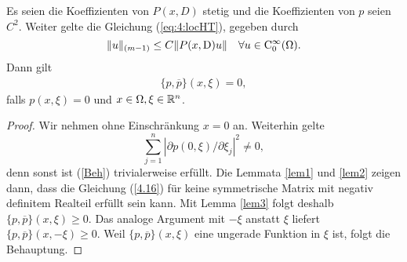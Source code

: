 \begin{thm}
Es seien die Koeffizienten von $P(x,D)$ stetig und die Koeffizienten von $p$ seien $C^2$. Weiter gelte die Gleichung (\ref{eq:4:locHT}), gegeben durch
\[
  \| u\|_{(m-1)} \le C \| P(x,\mathrm D) u \| \quad \forall u\in\mathrm C_0^\infty(\Omega).
\]
Dann gilt 
\begin{align}
	\label{Beh}
\{p,\overline p\} (x,\xi) = 0,
\end{align}
falls $p(x,\xi) = 0$ und $x \in \Omega, \xi \in \mathbb R^n$.
\end{thm}
\begin{proof}
Wir nehmen ohne Einschränkung $x=0$ an. Weiterhin gelte
\[
\sum_{j=1}^{n}|\partial p(0,\xi)/\partial \xi_j|^2 \neq 0,
\]
denn sonst ist (\ref{Beh}) trivialerweise erfüllt. Die Lemmata \ref{lem1} und \ref{lem2} zeigen dann, dass die Gleichung (\ref{4.16}) für keine symmetrische Matrix mit negativ definitem Realteil erfüllt sein kann. Mit Lemma \ref{lem3} folgt deshalb $\{p,\overline p\}(x,\xi) \ge 0$. Das analoge Argument mit $-\xi$ anstatt $\xi$ liefert $\{p,\overline p\}(x,-\xi) \ge 0$. Weil $\{p,\overline p\}(x,\xi)$ eine ungerade Funktion in $\xi$ ist, folgt die Behauptung.
\end{proof}